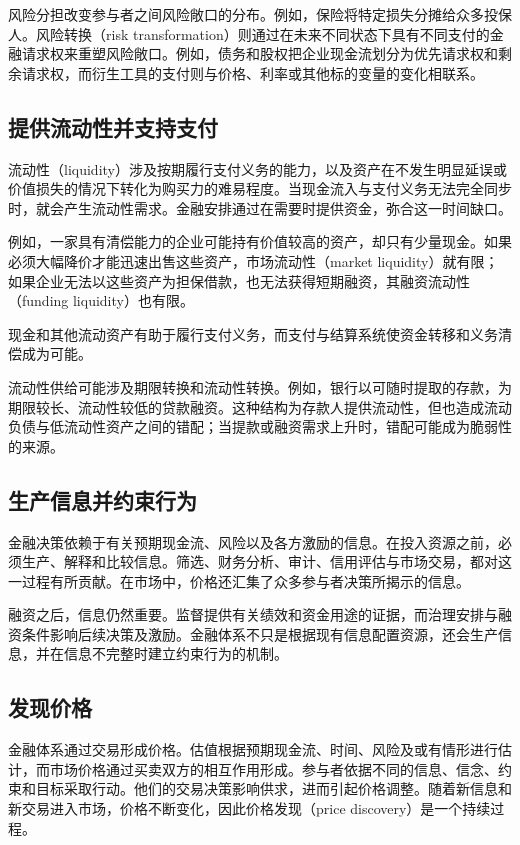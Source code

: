 风险分担改变参与者之间风险敞口的分布。例如，保险将特定损失分摊给众多投保人。风险转换（risk transformation）则通过在未来不同状态下具有不同支付的金融请求权来重塑风险敞口。例如，债务和股权把企业现金流划分为优先请求权和剩余请求权，而衍生工具的支付则与价格、利率或其他标的变量的变化相联系。


\subsection{提供流动性并支持支付}

流动性（liquidity）涉及按期履行支付义务的能力，以及资产在不发生明显延误或价值损失的情况下转化为购买力的难易程度。当现金流入与支付义务无法完全同步时，就会产生流动性需求。金融安排通过在需要时提供资金，弥合这一时间缺口。

例如，一家具有清偿能力的企业可能持有价值较高的资产，却只有少量现金。如果必须大幅降价才能迅速出售这些资产，市场流动性（market liquidity）就有限；如果企业无法以这些资产为担保借款，也无法获得短期融资，其融资流动性（funding liquidity）也有限。

现金和其他流动资产有助于履行支付义务，而支付与结算系统使资金转移和义务清偿成为可能。

流动性供给可能涉及期限转换和流动性转换。例如，银行以可随时提取的存款，为期限较长、流动性较低的贷款融资。这种结构为存款人提供流动性，但也造成流动负债与低流动性资产之间的错配；当提款或融资需求上升时，错配可能成为脆弱性的来源。

\subsection{生产信息并约束行为}

金融决策依赖于有关预期现金流、风险以及各方激励的信息。在投入资源之前，必须生产、解释和比较信息。筛选、财务分析、审计、信用评估与市场交易，都对这一过程有所贡献。在市场中，价格还汇集了众多参与者决策所揭示的信息。

融资之后，信息仍然重要。监督提供有关绩效和资金用途的证据，而治理安排与融资条件影响后续决策及激励。金融体系不只是根据现有信息配置资源，还会生产信息，并在信息不完整时建立约束行为的机制。

\subsection{发现价格}

金融体系通过交易形成价格。估值根据预期现金流、时间、风险及或有情形进行估计，而市场价格通过买卖双方的相互作用形成。参与者依据不同的信息、信念、约束和目标采取行动。他们的交易决策影响供求，进而引起价格调整。随着新信息和新交易进入市场，价格不断变化，因此价格发现（price discovery）是一个持续过程。

